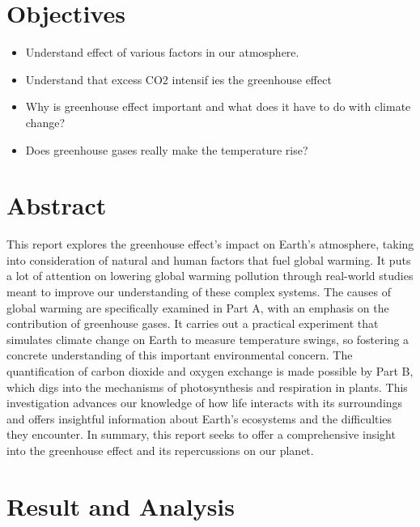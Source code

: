 \documentclass[a4paper, 12pt, english]{article}
\begin{document}


\newpage
\section{Objectives}
\begin{itemize}
	\item Understand effect of various factors in our atmosphere.
	\item Understand that excess CO2 intensif ies the greenhouse effect
	\item Why is greenhouse effect important and what does it have to do with climate
	      change?
	\item Does greenhouse gases really make the temperature rise?
\end{itemize}
\section{Abstract}
This report explores the greenhouse effect's impact on Earth's atmosphere,
taking into consideration of natural and human factors that fuel global
warming. It puts a lot of attention on lowering global warming pollution
through real-world studies meant to improve our understanding of these
complex systems. The causes of global warming are specifically examined
in Part A, with an emphasis on the contribution of greenhouse gases. It
carries out a practical experiment that simulates climate change on Earth
to measure temperature swings, so fostering a concrete understanding of
this important environmental concern. The quantification of carbon dioxide
and oxygen exchange is made possible by Part B, which digs into the mechanisms
of photosynthesis and respiration in plants. This investigation advances
our knowledge of how life interacts with its surroundings and offers
insightful information about Earth's ecosystems and the difficulties they
encounter. In summary, this report seeks to offer a comprehensive insight
into the greenhouse effect and its repercussions on our planet.

\section{Result and Analysis}
\end{document}

